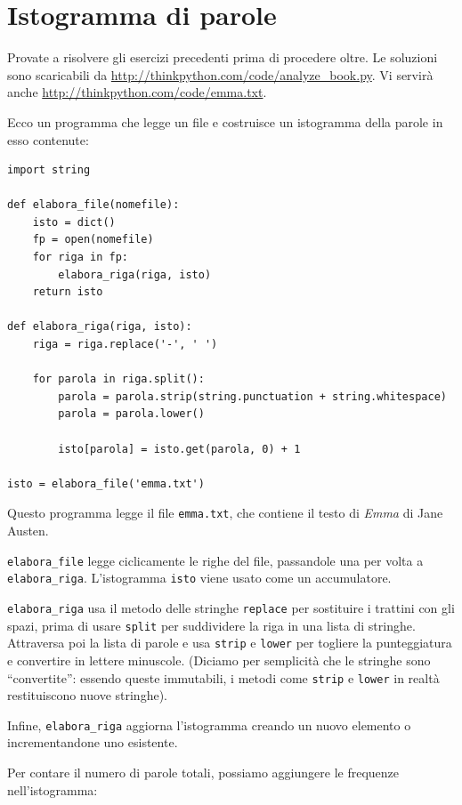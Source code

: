 \documentclass[10pt]{book}
\begin{document}
\section{Istogramma di parole}

Provate a risolvere gli esercizi precedenti prima di procedere oltre. Le soluzioni sono scaricabili da
 \url{http://thinkpython.com/code/analyze_book.py}.  Vi servirà anche \url{http://thinkpython.com/code/emma.txt}.

Ecco un programma che legge un file e costruisce un istogramma della parole in esso contenute:

\begin{verbatim}
import string

def elabora_file(nomefile):
    isto = dict()
    fp = open(nomefile)
    for riga in fp:
        elabora_riga(riga, isto)
    return isto

def elabora_riga(riga, isto):
    riga = riga.replace('-', ' ')
    
    for parola in riga.split():
        parola = parola.strip(string.punctuation + string.whitespace)
        parola = parola.lower()

        isto[parola] = isto.get(parola, 0) + 1

isto = elabora_file('emma.txt')
\end{verbatim}
%
Questo programma legge il file {\tt emma.txt}, che contiene il testo di {\em
  Emma} di Jane Austen.

\verb"elabora_file" legge ciclicamente le righe del file, passandole una per volta a \verb"elabora_riga".  L'istogramma {\tt isto} viene usato come un accumulatore.

\verb"elabora_riga" usa il metodo delle stringhe {\tt replace} per sostituire i trattini con gli spazi, prima di usare {\tt split} per suddividere la riga in una lista di stringhe. Attraversa poi la lista di parole e usa {\tt strip}
e {\tt lower} per togliere la punteggiatura e convertire in lettere minuscole. (Diciamo per semplicità che le stringhe sono ``convertite'': essendo queste immutabili, i metodi come {\tt strip} e {\tt lower} in realtà restituiscono nuove stringhe).

Infine, \verb"elabora_riga" aggiorna l'istogramma creando un nuovo elemento o incrementandone uno esistente.

Per contare il numero di parole totali, possiamo aggiungere le frequenze nell'istogramma:
\end{document}
